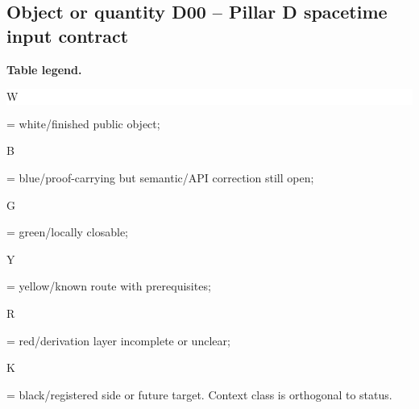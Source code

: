 \subsection*{Object or quantity D00 -- Pillar D spacetime input contract}
\hypertarget{objproof:D00}{}
\par\smallskip\noindent\begin{minipage}{0.99\linewidth}\footnotesize\raggedright\textbf{Table legend.} \colorbox{white}{\strut W} = white/finished public object; \colorbox{cyan!20}{\strut B} = blue/proof-carrying but semantic/API correction still open; \colorbox{green!18}{\strut G} = green/locally closable; \colorbox{yellow!25}{\strut Y} = yellow/known route with prerequisites; \colorbox{red!20}{\strut R} = red/derivation layer incomplete or unclear; \colorbox{black!18}{\strut K} = black/registered side or future target. Context class is orthogonal to status.\end{minipage}\par\vspace{0.25em}
